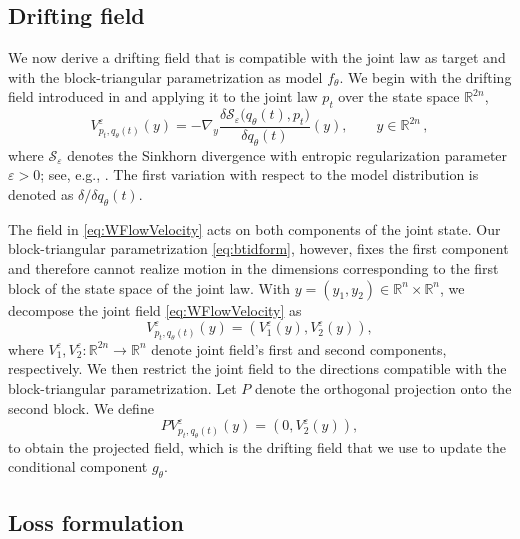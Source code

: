 \documentclass[oneside,11pt]{article}
\theoremstyle{remark}
\newcommand{\R}{\mathbb{R}}
\begin{document}
\subsection{Drifting field}
\label{subsec:ProjectedWFlow}
We now derive a drifting field that is compatible with the joint law as target and with the block-triangular parametrization as model $f_{\theta}$. 
We begin with the drifting field introduced in \cite{han2026wflow} and applying it to the joint law $p_t$ over the state space $\R^{2n}$, 
\begin{equation}\label{eq:WFlowVelocity}
        V_{p_t,q_{\theta}(t)}^{\varepsilon}(y)
        =
        -
        \nabla_y
        \frac{\delta
        \mathcal{S}_{\varepsilon}
        \big(q_{\theta}(t),p_t\big)}
        {\delta q_{\theta}(t)}(y),
        \qquad
        y\in\R^{2n}\,,
    \end{equation}
where $\mathcal{S}_{\varepsilon}$ denotes the Sinkhorn divergence with entropic regularization parameter $\varepsilon>0$; see, e.g., \cite{pmlr-v89-feydy19a}.  The first variation with respect to the model distribution is denoted as $\delta/\delta q_{\theta}(t)$. 

The field in \eqref{eq:WFlowVelocity} acts on both components of the
    joint state. Our block-triangular parametrization \eqref{eq:btidform},
    however, fixes the first component     and therefore cannot realize motion in the dimensions corresponding to the first block of the state space of the joint law.
 With $y=(y_1,y_2)\in\R^n\times\R^n$, we decompose the joint field \eqref{eq:WFlowVelocity} as
    \[
        V_{p_t,q_{\theta}(t)}^{\varepsilon}(y)
        =
        \left(
            V_1^{\varepsilon}(y),
            V_2^{\varepsilon}(y)
        \right),
    \]
    where $V_1^{\varepsilon},V_2^{\varepsilon}:\R^{2n}\to\R^n$ denote joint field's
    first and second components, respectively.
 We then restrict the joint field to the directions compatible with the block-triangular parametrization. Let $P$ denote the orthogonal projection onto the second block. We define
\begin{equation}\label{eq:ProjectedDrift}
        P V_{p_t,q_{\theta}(t)}^{\varepsilon}(y)
        =
        \left(
            0,
            V_2^{\varepsilon}(y)
        \right),
    \end{equation}
    to obtain the projected field, which is the drifting field that we use to update the conditional component $g_{\theta}$.



\subsection{Loss formulation}
\label{subsec:LossFormulation}
\end{document}
